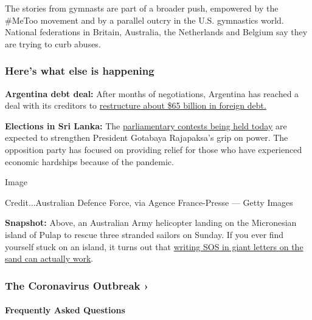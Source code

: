 The stories from gymnasts are part of a broader push, empowered by the
\#MeToo movement and by a parallel outcry in the U.S. gymnastics world.
National federations in Britain, Australia, the Netherlands and Belgium
say they are trying to curb abuses.

\hypertarget{heres-what-else-is-happening}{%
\subsubsection{Here's what else is
happening}\label{heres-what-else-is-happening}}

\textbf{Argentina debt deal:} After months of negotiations, Argentina
has reached a deal with its creditors to
\href{https://www.nytimes3xbfgragh.onion/live/2020/08/04/business/stock-market-today-coronavirus\#argentina-secures-a-deal-to-restructure-65-billion-in-debt}{restructure
about \$65 billion in foreign debt.}

\textbf{Elections in Sri Lanka:} The
\href{https://www.nytimes3xbfgragh.onion/aponline/2020/08/04/world/asia/ap-as-sri-lanka-election-glance.html}{parliamentary
contests being held today} are expected to strengthen President Gotabaya
Rajapaksa's grip on power. The opposition party has focused on providing
relief for those who have experienced economic hardships because of the
pandemic.

Image

Credit...Australian Defence Force, via Agence France-Presse --- Getty
Images

\textbf{Snapshot:} Above, an Australian Army helicopter landing on the
Micronesian island of Pulap to rescue three stranded sailors on Sunday.
If you ever find yourself stuck on an island, it turns out that
\href{https://www.nytimes3xbfgragh.onion/2020/08/04/world/australia/sos-pacific-island.html}{writing
SOS in giant letters on the sand can actually work}.

\href{https://www.nytimes3xbfgragh.onion/news-event/coronavirus?action=click\&pgtype=Article\&state=default\&region=MAIN_CONTENT_3\&context=storylines_faq}{}

\hypertarget{the-coronavirus-outbreak-}{%
\subsubsection{The Coronavirus Outbreak
›}\label{the-coronavirus-outbreak-}}

\hypertarget{frequently-asked-questions}{%
\paragraph{Frequently Asked
Questions}\label{frequently-asked-questions}}


